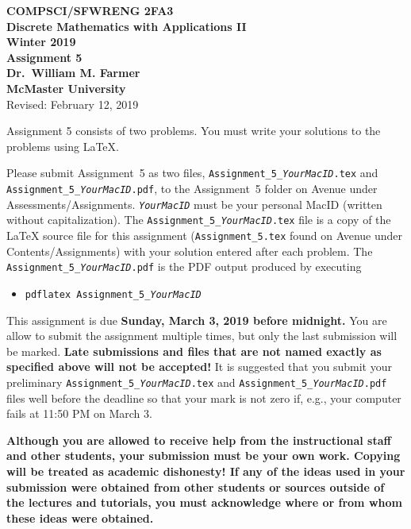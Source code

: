 \documentclass[11pt,fleqn]{article}
\begin{document}
\begin{center}

  {\large \textbf{COMPSCI/SFWRENG 2FA3}}\\[2mm]
  {\large \textbf{Discrete Mathematics with Applications II}}\\[2mm]
  {\large \textbf{Winter 2019}}\\[8mm]
  {\huge \textbf{Assignment 5}}\\[6mm]
  {\large \textbf{Dr.~William M. Farmer}}\\[2mm]
  {\large \textbf{McMaster University}}\\[6mm]
  {\large Revised: February 12, 2019}

\end{center}

\medskip

Assignment 5 consists of two problems.  You must write your solutions
to the problems using LaTeX.

Please submit Assignment~5 as two files,
\texttt{Assignment\_5\_\emph{YourMacID}.tex} and
\texttt{Assignment\_5\_\emph{YourMacID}.pdf}, to the Assignment~5
folder on Avenue under Assessments/Assignments.
\texttt{\emph{YourMacID}} must be your personal MacID (written without
capitalization).  The \texttt{Assignment\_5\_\emph{YourMacID}.tex}
file is a copy of the LaTeX source file for this assignment
(\texttt{Assignment\_5.tex} found on Avenue under
Contents/Assignments) with your solution entered after each problem.
The \texttt{Assignment\_5\_\emph{YourMacID}.pdf} is the PDF output
produced by executing

\begin{itemize}

  \item[] \texttt{pdflatex Assignment\_5\_\emph{YourMacID}}

\end{itemize}

This assignment is due \textbf{Sunday, March 3, 2019 before
  midnight.}  You are allow to submit the assignment multiple times,
but only the last submission will be marked.  \textbf{Late submissions
  and files that are not named exactly as specified above will not be
  accepted!}  It is suggested that you submit your preliminary
\texttt{Assignment\_5\_\emph{YourMacID}.tex} and
\texttt{Assignment\_5\_\emph{YourMacID}.pdf} files well before the
deadline so that your mark is not zero if, e.g., your computer fails
at 11:50 PM on March 3.

\textbf{Although you are allowed to receive help from the
  instructional staff and other students, your submission must be your
  own work.  Copying will be treated as academic dishonesty! If any of
  the ideas used in your submission were obtained from other students
  or sources outside of the lectures and tutorials, you must
  acknowledge where or from whom these ideas were obtained.}
\end{document}
